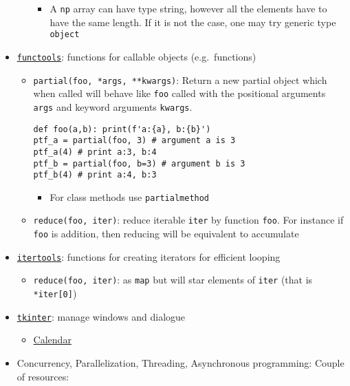 \documentclass[a4paper,12pt,%
              final%
              ]{article}
\begin{document}
\begin{itemize}
\begin{itemize}
\begin{itemize}
          \item A \texttt{np} array can have type string, however all the elements have to have the same length. If it is not the case, one may try generic type \texttt{object}
        \end{itemize}
    \end{itemize}
  \item \href{https://docs.python.org/3/library/functools.html}{\texttt{functools}}: functions for callable objects (e.g.\ functions)
    \begin{itemize}
      \item \verb|partial(foo, *args, **kwargs)|: Return a new partial object which when called will behave like \texttt{foo} called with the positional arguments \texttt{args} and keyword arguments \texttt{kwargs}.
\begin{verbatim}
def foo(a,b): print(f'a:{a}, b:{b}')
ptf_a = partial(foo, 3) # argument a is 3
ptf_a(4) # print a:3, b:4
ptf_b = partial(foo, b=3) # argument b is 3
ptf_b(4) # print a:4, b:3
\end{verbatim}
        \begin{itemize}
          \item For class methods use \texttt{partialmethod}
        \end{itemize}
      \item \verb|reduce(foo, iter)|: reduce iterable \texttt{iter} by function \texttt{foo}. For instance if \texttt{foo} is addition, then reducing will be equivalent to accumulate
    \end{itemize}
  \item \href{https://docs.python.org/3/library/itertools.html}{\texttt{itertools}}: functions for creating iterators for efficient looping
    \begin{itemize}
      \item \verb|reduce(foo, iter)|: as \texttt{map} but will star elements of \texttt{iter} (that is \verb|*iter[0]|)
    \end{itemize}
  \item \href{https://docs.python.org/3/library/tkinter.html}{\texttt{tkinter}}: manage windows and dialogue
    \begin{itemize}
      \item \href{https://tkcalendar.readthedocs.io/en/stable/index.html}{Calendar}
    \end{itemize}
  \item Concurrency, Parallelization, Threading, Asynchronous programming: Couple of resources:

\end{itemize}
\end{document}
